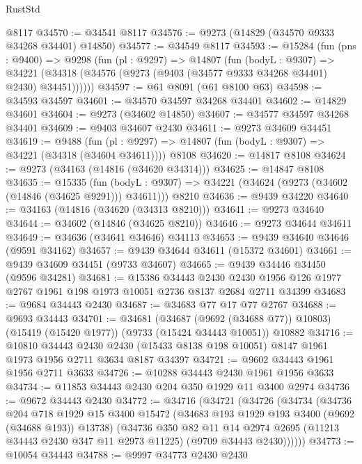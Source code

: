 \begin{lexlean}{RustStd}
\begin{coremodule}
{\begin{coremodule}
{{{{{{{{{{{{{{{{{{{{{{{{{{{{{{{{{{{{{{{{{{{{{{{{{{{{{{{    @8117
@34570 := @34541 @8117
@34576 := @9273 (@14829 (@34570 @9333 @34268 @34401) @14850)
@34577 := @34549 @8117
@34593 := @15284
    (fun (pns : @9400) =>
    @9298
      (fun (pl : @9297) =>
      @14807
        (fun (bodyL : @9307) =>
        @34221 (@34318 (@34576 (@9273 (@9403 (@34577 @9333 @34268 @34401) @2430) @34451))))))
@34597 := @61 @8091 (@61 @8100 @63)
@34598 := @34593 @34597
@34601 := @34570 @34597 @34268 @34401
@34602 := @14829 @34601
@34604 := @9273 (@34602 @14850)
@34607 := @34577 @34597 @34268 @34401
@34609 := @9403 @34607 @2430
@34611 := @9273 @34609 @34451
@34619 := @9488
    (fun (pl : @9297) => @14807 (fun (bodyL : @9307) => @34221 (@34318 (@34604 @34611))))
    @8108
@34620 := @14817 @8108
@34624 := @9273 (@34163 (@14816 (@34620 @34314)))
@34625 := @14847 @8108
@34635 := @15335
    (fun (bodyL : @9307) => @34221 (@34624 (@9273 (@34602 (@14846 (@34625 @9291))) @34611)))
    @8210
@34636 := @9439 @34220
@34640 := @34163 (@14816 (@34620 (@34313 @8210)))
@34641 := @9273 @34640
@34644 := @34602 (@14846 (@34625 @8210))
@34646 := @9273 @34644 @34611
@34649 := @34636 (@34641 @34646) @34113
@34653 := @9439 @34640 @34646 (@9591 @34162)
@34657 := @9439 @34644 @34611 (@15372 @34601)
@34661 := @9439 @34609 @34451 (@9733 @34607)
@34665 := @9439 @34446 @34450 (@9596 @34281)
@34681 := @15386
    @34443
    @2430
    @2430
    @1956
    @126
    @1977
    @2767
    @1961
    @198
    @1973
    @10051
    @2736
    @8137
    @2684
    @2711
    @34399
@34683 := @9684 @34443 @2430
@34687 := @34683 @77 @17 @77 @2767
@34688 := @9693 @34443
@34701 := @34681
    (@34687 (@9692 (@34688 @77)) @10803)
    (@15419 (@15420 @1977))
    (@9733 (@15424 @34443 @10051))
    @10882
@34716 := @10810
    @34443
    @2430
    @2430
    (@15433 @8138 @198 @10051)
    @8147
    @1961
    @1973
    @1956
    @2711
    @3634
    @8187
    @34397
@34721 := @9602 @34443 @1961 @1956 @2711 @3633
@34726 := @10288 @34443 @2430 @1961 @1956 @3633
@34734 := @11853 @34443 @2430 @204 @350 @1929 @11 @3400 @2974
@34736 := @9672 @34443 @2430
@34772 := @34716
    (@34721
      (@34726
        (@34734
          (@34736
            @204
            @718
            @1929
            @15
            @3400
            @15472
            (@34683 @193 @1929 @193 @3400 (@9692 (@34688 @193)) @13738)
            (@34736
              @350
              @82
              @11
              @14
              @2974
              @2695
              (@11213 @34443 @2430 @347 @11 @2973 @11225)
              (@9709 @34443 @2430))))))
@34773 := @10054 @34443
@34788 := @9997
    @34773
    @2430
    @2430
}}}}}}}}}}}}}}}}}}}}}}}}}}}}}}}}}}}}}}}}}}}}}}}}}}}}}}}
\end{coremodule}}
\end{coremodule}
\end{lexlean}
